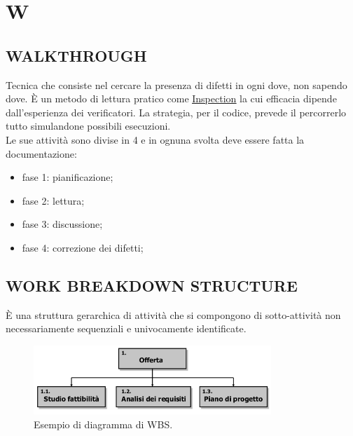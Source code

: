 \newpage
	\section{W} \label{sec:W}
		\subsection{WALKTHROUGH}  \label{walkthrough} %
		Tecnica che consiste nel cercare la presenza di difetti in ogni dove, non sapendo dove. È un metodo di lettura pratico come \underline{\hyperref[inspection]{Inspection}} la cui efficacia dipende dall'esperienza dei verificatori. La strategia, per il codice, prevede il percorrerlo tutto simulandone possibili esecuzioni. \\
		Le sue attività sono divise in 4 e in ognuna svolta deve essere fatta la documentazione:
		\begin{itemize}
			\item fase 1: pianificazione;
			\item fase 2: lettura;
			\item fase 3: discussione;
			\item fase 4: correzione dei difetti;
		\end{itemize}
		
		\subsection{WORK BREAKDOWN STRUCTURE}  \label{wbs}
		È una struttura gerarchica di attività che si compongono di sotto-attività non necessariamente sequenziali e univocamente identificate. 
		
		\begin{figure}[H]
			\centering
			\includegraphics[width=0.8\textwidth]{img/wbs}		
			\caption{Esempio di diagramma di WBS.}
		\end{figure} 
	
	
